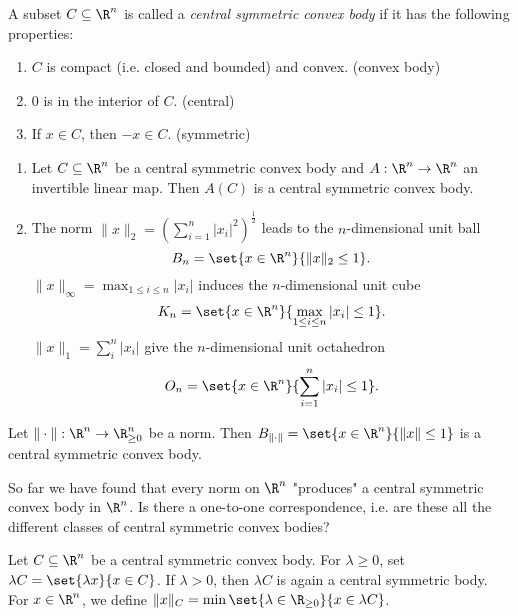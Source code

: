 \begin{defn*}
	A subset \( C \subseteq \R^n \) is called a \emph{central symmetric convex body} if it has the following properties:
	\begin{enumerate}[label=(\alph*)]
		\item \( C \) is compact (i.e. closed and bounded) and convex. (convex body)
		\item \( 0 \) is in the interior of \( C \). (central)
		\item If \( x \in C \), then \( -x \in C \). (symmetric)
	\end{enumerate}
\end{defn*}

\begin{exmp*}
	\begin{enumerate}
		\item Let \( C \subseteq \R^n \) be a central symmetric convex body and \( A: \R^n \to \R^n \) an invertible linear map.
			Then \( A(C) \) is a central symmetric convex body.
		\item The norm \( \|x\|_2 = \left( \sum_{i=1}^{n} |x_i|^2 \right)^\frac{1}{2} \) leads to the \( n \)-dimensional unit ball
			\[ B_n = \set{x \in \R^n}{\|x\|_2 \leq 1}. \]
			\( \|x\|_\infty = \max_{1 \leq i \leq n}|x_i| \) induces the \( n \)-dimensional unit cube
			\[ K_n = \set{x \in \R^n}{\max_{1 \leq i \leq n} |x_i| \leq 1}. \]
			\( \|x\|_1 = \sum_{i}^{n} |x_i| \) give the \( n \)-dimensional unit octahedron
			\[ O_n = \set{x \in \R^n}{\sum_{i=1}^{n}|x_i| \leq 1}. \]
	\end{enumerate}
\end{exmp*}

\begin{lem}
	Let \( \|\cdot\|: \R^n \to \R^n_{\geq 0} \) be a norm.
	Then \( B_{\|\cdot\|} = \set{x \in \R^n}{\| x \| \leq 1} \) is a central symmetric convex body.
\end{lem}

So far we have found that every norm on \( \R^n \) "produces" a central symmetric convex body in \( \R^n \).
Is there a one-to-one correspondence, i.e. are these all the different classes of central symmetric convex bodies?

\begin{rem*}
	Let \( C \subseteq \R^n \) be a central symmetric convex body.
	For \( \lambda \geq 0 \), set \( \lambda C = \set{\lambda x}{x \in C} \).
	If \( \lambda > 0 \), then \( \lambda C \) is again a central symmetric body.
	For \( x \in \R^n \), we define \( \|x\|_C = \min \set{\lambda \in \R_{\geq 0}}{x \in \lambda C} \).
\end{rem*}

